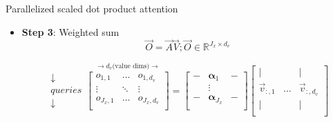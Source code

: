 
\begin{vbframe}{Parallelized scaled dot product attention}

\vfill

\begin{itemize}
\item \textbf{Step 3}: Weighted sum
$$\vec {O} = \vec {A} \vec {V}; \vec O \in \mathbb{R}^{J_x \times d_v}$$

$$
\begin{matrix} \downarrow \\ queries \\ \downarrow \end{matrix}
	\overset{\rightarrow d_v \text{(value dims)} \rightarrow}{
\begin{bmatrix}
o_{1,1} & \ldots & o_{1,d_v} \\
\vdots & \ddots & \vdots \\
o_{J_x,1} & \ldots & o_{J_x,d_v} \\
\end{bmatrix}} =
\begin{bmatrix} 
- & \boldsymbol \alpha_1  & -  \\
& \vdots & \\
-  & \boldsymbol \alpha_{J_x}  &  -  \\
\end{bmatrix}  
\begin{bmatrix} 
\lvert &  & \lvert  \\
\vec {v}_{:,1} & \ldots & \vec {v}_{:,d_v} \\
\lvert &  & \lvert  \\
\end{bmatrix}
$$
\end{itemize}

\vfill

\end{vbframe}


